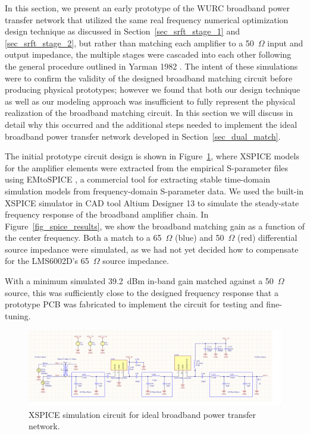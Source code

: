 	In this section, we present an early prototype of the \ac{WURC} broadband power transfer network that utilized the same real frequency numerical optimization design technique as discussed in Section~\ref{sec_srft_stage_1} and \ref{sec_srft_stage_2}, but rather than matching each amplifier to a 50~$\Omega$ input and output impedance, the multiple stages were cascaded into each other following the general procedure outlined in Yarman 1982 \cite{yarman1982simplified}.
	The intent of these simulations were to confirm the validity of the designed broadband matching circuit before producing physical prototypes; however we found that both our design technique as well as our modeling approach was insufficient to fully represent the physical realization of the broadband matching circuit.
	In this section we will discuss in detail why this occurred and the additional steps needed to implement the ideal broadband power transfer network developed in Section~\ref{sec_dual_match}.

	The initial prototype circuit design is shown in Figure~\ref{fig_spice_circuit}, where XSPICE models for the amplifier elements were extracted from the empirical S-parameter files using EMtoSPICE \cite{mandrutareduced}, a commercial tool for extracting stable time-domain simulation models from frequency-domain S-parameter data.
	We used the built-in XSPICE simulator in \ac{CAD} tool Altium Designer 13 to simulate the steady-state frequency response of the broadband amplifier chain.
	In Figure~\ref{fig_spice_results}, we show the broadband matching gain as a function of the center frequency.
	Both a match to a 65~$\Omega$ (blue) and 50~$\Omega$ (red) differential source impedance were simulated, as we had not yet decided how to compensate for the LMS6002D's 65~$\Omega$ source impedance.
	
	With a minimum simulated 39.2~dBm in-band gain matched against a 50~$\Omega$ source, this was sufficiently close to the designed frequency response that a prototype \ac{PCB} was fabricated to implement the circuit for testing and fine-tuning.
	
\begin{figure}[p]
\centering
  \includegraphics[width=1\linewidth]{figs/matching/tqp_rfpa_circuit_50_65_load}   
    \caption{XSPICE simulation circuit for ideal broadband power transfer network.}
\label{fig_spice_circuit}
\end{figure}

